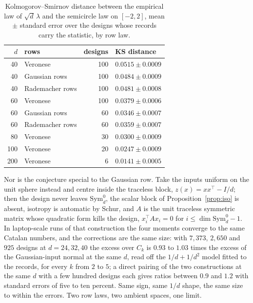 \documentclass[11pt]{article}
\theoremstyle{definition}
\begin{document}
\begin{table}[t]
\centering\small
\caption{Kolmogorov--Smirnov distance between the empirical law of $\sqrt d\,\lambda$ and the
semicircle law on $[-2,2]$, mean $\pm$ standard error over the designs whose records carry the
statistic, by row law.}
\label{tab:kssemi}
\begin{tabular}{rlrl}
\toprule
$d$ & rows & designs & KS distance\\
\midrule
40 & Veronese & 100 & $0.0515\pm0.0009$\\
40 & Gaussian rows & 100 & $0.0484\pm0.0009$\\
40 & Rademacher rows & 100 & $0.0481\pm0.0008$\\
60 & Veronese & 100 & $0.0379\pm0.0006$\\
60 & Gaussian rows & 60 & $0.0346\pm0.0007$\\
60 & Rademacher rows & 60 & $0.0359\pm0.0007$\\
80 & Veronese & 30 & $0.0300\pm0.0009$\\
100 & Veronese & 20 & $0.0247\pm0.0009$\\
200 & Veronese & 6 & $0.0141\pm0.0005$\\
\bottomrule
\end{tabular}
\end{table}

Nor is the conjecture special to the Gaussian row. Take the inputs uniform on the unit sphere
instead and centre inside the traceless block, $z(x)=xx^\top-I/d$; then the design never leaves
$\mathrm{Sym}_d^0$, the scalar block of Proposition~\ref{prop:iso} is absent, isotropy is automatic
by Schur, and $A$ is the unit traceless symmetric matrix whose quadratic form kills the design,
$x_i^\top Ax_i=0$ for $i\le\dim\mathrm{Sym}_d^0-1$. In laptop-scale runs of that construction
the four moments converge to the same Catalan numbers, and the corrections are the same size: with
$7{,}373$, $2{,}650$ and $925$ designs at $d=24,32,40$ the excess over $C_k$ is $0.93$ to $1.03$
times the excess of the Gaussian-input normal at the same $d$, read off the $1/d+1/d^2$ model fitted
to the records, for every $k$ from $2$ to $5$; a direct pairing of the two constructions at the same
$d$ with a few hundred designs each gives ratios between $0.9$ and $1.2$ with standard errors of
five to ten percent. Same sign, same $1/d$ shape, the same size to within the errors. Two row laws,
two ambient spaces, one limit.
\end{document}
